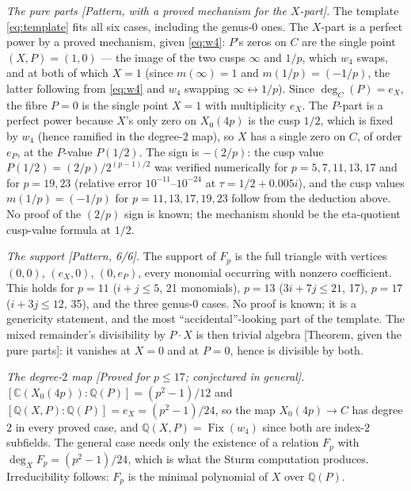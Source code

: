 \documentclass[11pt]{amsart}
\theoremstyle{plain}
\theoremstyle{definition}
\theoremstyle{remark}
\newcommand{\Q}{\mathbb{Q}}
\newcommand{\C}{\mathbb{C}}
\begin{document}
\emph{The pure parts [Pattern, with a proved mechanism for the $X$-part].}
The template \eqref{eq:template} fits all six cases, including the genus-$0$
ones. The $X$-part is a perfect power by a proved mechanism, given
\eqref{eq:w4}: $P$'s zeros on $C$ are the single point $(X,P) = (1,0)$ --- the
image of the two cusps $\infty$ and $1/p$, which $w_4$ swaps, and at both of
which $X = 1$ (since $m(\infty) = 1$ and $m(1/p) = (-1/p)$, the latter
following from \eqref{eq:w4} and $w_4$ swapping $\infty \leftrightarrow 1/p$).
Since $\deg_C(P) = e_X$, the fibre $P = 0$ is the single point $X = 1$ with
multiplicity $e_X$. The $P$-part is a perfect power because $X$'s only zero on
$X_0(4p)$ is the cusp $1/2$, which is fixed by $w_4$ (hence ramified in the
degree-$2$ map), so $X$ has a single zero on $C$, of order $e_P$, at the
$P$-value $P(1/2)$. The sign is $-(2/p)$: the cusp value
$P(1/2) = (2/p)/2^{(p-1)/2}$ was verified numerically for $p = 5, 7, 11, 13, 17$
and for $p = 19, 23$ (relative error $10^{-11}$--$10^{-24}$ at
$\tau = 1/2 + 0.005i$), and the cusp values $m(1/p) = (-1/p)$ for
$p = 11, 13, 17, 19, 23$ follow from the deduction above. No proof of the
$(2/p)$ sign is known; the mechanism should be the eta-quotient cusp-value
formula at $1/2$.

\emph{The support [Pattern, 6/6].} The support of $F_p$ is the full triangle
with vertices $(0,0)$, $(e_X,0)$, $(0,e_P)$, every monomial occurring with
nonzero coefficient. This holds for $p = 11$ ($i+j \leq 5$, 21 monomials),
$p = 13$ ($3i+7j \leq 21$, 17), $p = 17$ ($i+3j \leq 12$, 35), and the three
genus-$0$ cases. No proof is known; it is a genericity statement, and the most
``accidental''-looking part of the template. The mixed remainder's divisibility
by $P\cdot X$ is then trivial algebra [Theorem, given the pure parts]: it
vanishes at $X = 0$ and at $P = 0$, hence is divisible by both.

\emph{The degree-$2$ map [Proved for $p \leq 17$; conjectured in general].}
$[\C(X_0(4p)):\Q(P)] = (p^2-1)/12$ and $[\Q(X,P):\Q(P)] = e_X = (p^2-1)/24$,
so the map $X_0(4p) \to C$ has degree $2$ in every proved case, and
$\Q(X,P) = \operatorname{Fix}(w_4)$ since both are index-$2$ subfields. The
general case needs only the existence of a relation $F_p$ with
$\deg_X F_p = (p^2-1)/24$, which is what the Sturm computation produces.
Irreducibility follows: $F_p$ is the minimal polynomial of $X$ over $\Q(P)$.
\end{document}
